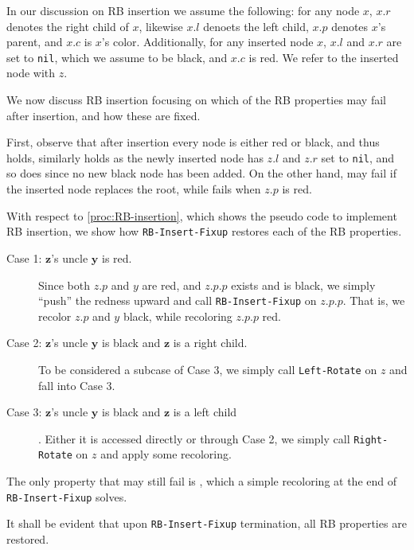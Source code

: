 \documentclass{subfiles}
\begin{document}
    In our discussion on RB insertion we assume the following: 
        for any node \(x\), \(x.r\) denotes the right child of \(x\), 
        likewise \(x.l\) denoets the left child, \(x.p\) denotes \(x\)'s parent, 
        and \(x.c\) is \(x\)'s color.
        Additionally, for any inserted node \(x\),  \(x.l\) and \(x.r\) are set to \lstinline{nil},
        which we assume to be black, and \(x.c\) is red. We refer to the inserted node with \(z\).

    We now discuss RB insertion focusing on which of the RB properties may fail after insertion,
        and how these are fixed.

    First, observe that after insertion every node is either red or black,
        and thus  holds, similarly  holds as the newly 
        inserted node has \(z.l\) and \(z.r\) set to \lstinline{nil},
        and so does  since no new black node has been added.
        On the other hand,  may fail if the inserted node replaces the root,
        while  fails when \(z.p\) is red.

    

    With respect to \autoref{proc:RB-insertion}, which shows the pseudo code to implement RB insertion,
        we show how \lstinline{RB-Insert-Fixup} restores each of the RB properties.
        \begin{description}
            \item [Case 1: \(\mathbf{z}\)'s uncle \(\mathbf{y}\) is red. ]
                Since both \(z.p\) and \(y\) are red, and \(z.p.p\) exists and is black,
                we simply ``push'' the redness upward and call \lstinline{RB-Insert-Fixup} on 
                \(z.p.p\). That is, we recolor \(z.p\) and \(y\) black, 
                while recoloring \(z.p.p\) red.

            \item [Case 2: \(\mathbf{z}\)'s uncle \(\mathbf{y}\) is black and \(\mathbf{z}\) is a right child.]
                To be considered a subcase of Case 3, we simply call \lstinline{Left-Rotate} on \(z\)
                and fall into Case 3.

            \item [Case 3: \(\mathbf{z}\)'s uncle \(\mathbf{y}\) is black and \(\mathbf{z}\) is a left child].
                Either it is accessed directly or through Case 2, 
                we simply call \lstinline{Right-Rotate} on \(z\) and apply some recoloring.
        \end{description}
        The only property that may still fail is , 
        which a simple recoloring at the end of \lstinline{RB-Insert-Fixup} solves.

    It shall be evident that upon \lstinline{RB-Insert-Fixup} termination, 
        all RB properties are restored.
        
\end{document}
